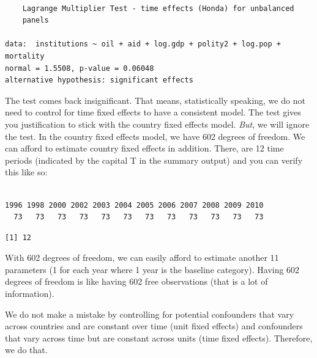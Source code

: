 \documentclass[]{article}
\newenvironment{Shaded}{\begin{snugshade}}{\end{snugshade}}
\newcommand{\KeywordTok}[1]{\textcolor[rgb]{0.13,0.29,0.53}{\textbf{#1}}}
\newcommand{\CommentTok}[1]{\textcolor[rgb]{0.56,0.35,0.01}{\textit{#1}}}
\newcommand{\OperatorTok}[1]{\textcolor[rgb]{0.81,0.36,0.00}{\textbf{#1}}}
\newcommand{\NormalTok}[1]{#1}
\theoremstyle{definition}
\theoremstyle{definition}
\theoremstyle{definition}
\theoremstyle{remark}
\begin{document}
\begin{verbatim}

    Lagrange Multiplier Test - time effects (Honda) for unbalanced
    panels

data:  institutions ~ oil + aid + log.gdp + polity2 + log.pop + mortality
normal = 1.5508, p-value = 0.06048
alternative hypothesis: significant effects
\end{verbatim}

The test comes back insignificant. That means, statistically speaking,
we do not need to control for time fixed effects to have a consistent
model. The test gives you justification to stick with the country fixed
effects model. \emph{But}, we will ignore the test. In the country fixed
effects model, we have 602 degrees of freedom. We can afford to estimate
country fixed effects in addition. There, are 12 time periods (indicated
by the capital T in the summary output) and you can verify this like so:

\begin{Shaded}
\end{Shaded}

\begin{verbatim}

1996 1998 2000 2002 2003 2004 2005 2006 2007 2008 2009 2010 
  73   73   73   73   73   73   73   73   73   73   73   73 
\end{verbatim}

\begin{Shaded}
\end{Shaded}

\begin{verbatim}
[1] 12
\end{verbatim}

With 602 degrees of freedom, we can easily afford to estimate another 11
parameters (1 for each year where 1 year is the baseline category).
Having 602 degrees of freedom is like having 602 free observations (that
is a lot of information).

We do not make a mistake by controlling for potential confounders that
vary across countries and are constant over time (unit fixed effects)
and confounders that vary across time but are constant across units
(time fixed effects). Therefore, we do that.
\end{document}
